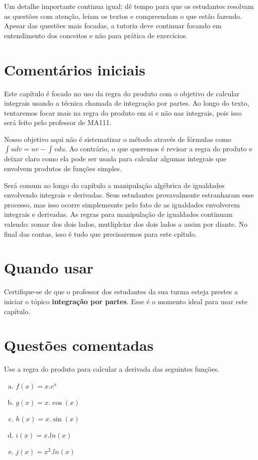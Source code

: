 \documentclass[main_estudante.tex]{subfiles}
\begin{document}
Um detalhe importante continua igual: dê tempo para que os estudantes resolvam as questões com atenção, leiam os textos e compreendam o que estão fazendo. Apesar das questões mais focadas, a tutoria deve continuar focando em entendimento dos conceitos e não para prática de exercícios.

\section{Comentários iniciais}

Este capítulo é focado no uso da regra do produto com o objetivo de calcular integrais usando a técnica chamada de integração por partes. Ao longo do texto, tentaremos focar mais na regra do produto em si e não nas integrais, pois isso será feito pelo professor de MA111.

Nosso objetivo aqui não é sistematizar o método através de fórmulas como $\int udv=uv-\int vdu$. Ao contrário, o que queremos é revisar a regra do produto e deixar claro como ela pode ser usada para calcular algumas integrais que envolvem produtos de funções simples.

Será comum ao longo do capítulo a manipulação algébrica de igualdades envolvendo integrais e derivadas. Seus estudantes provavalmente estranharam esse processo, mas isso ocorre simplemesnte pelo fato de as igualdades envolverem integrais e derivadas. As regras para manipulação de igualdades continuam valendo: somar dos dois lados, mutliplciar dos dois lados a assim por diante. No final das contas, isso é tudo que precisaremos para este cpítulo.

\section{Quando usar}

Certifique-se de que o professor dos estudantes da sua turma esteja prestes a iniciar o tópico \textbf{integração por partes}. Esse é o momento ideal para usar este capítulo.

\section{Questões comentadas}

\begin{questao}
Use a regra do produto para calcular a derivada das seguintes funções.
\begin{enumerate}[a)]
\item $f(x)=x . e^x$
\item $g(x)=x . \cos(x)$
\item $h(x)=x . \sin(x)$
\item $i(x)=x. ln(x)$
\item $j(x)=x^2 . ln(x)$
\end{enumerate}
\end{questao}
\end{document}
